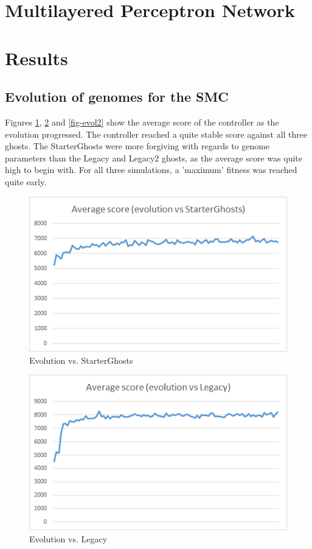 \documentclass[conference]{IEEEtran}
\begin{document}
\section{Multilayered Perceptron Network}



\section{Results}

\subsection{Evolution of genomes for the SMC}

Figures \ref{fig-evos}, \ref{fig-evol} and \ref{fig-evol2} show the average score of the controller as the evolution progressed. The controller reached a quite stable score against all three ghosts. The StarterGhosts were more forgiving with regards to genome parameters than the Legacy and Legacy2 ghosts, as the average score was quite high to begin with. For all three simulations, a 'maximum' fitness was reached quite early.

\begin{figure}[htp]
\centerline{\includegraphics[width=0.9\columnwidth]{s_evo.png}}
\caption{Evolution vs. StarterGhosts}
\label{fig-evos}
\end{figure}

\begin{figure}[htp]
\centerline{\includegraphics[width=0.9\columnwidth]{l_evo.png}}
\caption{Evolution vs. Legacy}
\label{fig-evol}
\end{figure}
\end{document}
